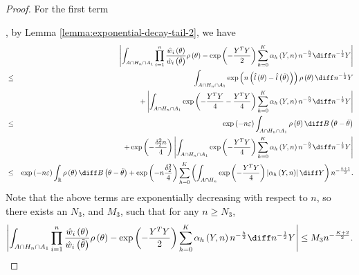 \begin{proof}
For the first term%
\begin{comment}
change the first second term ref into ref eq
\end{comment}
, by Lemma \ref{lemma:exponential-decay-tail-2}, we have
\begin{eqnarray*}
 &  & \left|\int_{A\cap H_{n}\cap A_{1}}\prod_{i=1}^{n}\frac{\hat{w}_{i}\left(\theta\right)}{\hat{w}_{i}\left(\tilde{\theta}\right)}\rho\left(\theta\right)-\exp\left(-\frac{Y^{T}Y}{2}\right)\sum_{h=0}^{K}\alpha_{h}\left(Y,n\right)n^{-\frac{h}{2}}\diff n^{-\frac{1}{2}}Y\right|\\
 & \le & \int_{A\cap H_{n}\cap A_{1}}\exp\left(n\left(\hat{l}\left(\theta\right)-\hat{l}\left(\tilde{\theta}\right)\right)\right)\rho\left(\theta\right)\diff n^{-\frac{1}{2}}Y\\
 &  & +\left|\int_{A\cap H_{n}\cap A_{1}}\exp\left(-\frac{Y^{T}Y}{4}-\frac{Y^{T}Y}{4}\right)\sum_{h=0}^{K}\alpha_{h}\left(Y,n\right)n^{-\frac{h}{2}}\diff n^{-\frac{1}{2}}Y\right|\\
 & \le & \exp\left(-n\varepsilon\right)\int_{A\cap H_{n}\cap A_{1}}\rho\left(\theta\right)\diff B\left(\theta-\tilde{\theta}\right)\\
 &  & +\exp\left(-\frac{\delta_{2}^{2}n}{4}\right)\left|\int_{A\cap H_{n}\cap A_{1}}\exp\left(-\frac{Y^{T}Y}{4}\right)\sum_{h=0}^{K}\alpha_{h}\left(Y,n\right)n^{-\frac{h}{2}}\diff n^{-\frac{1}{2}}Y\right|\\
 & \le & \exp\left(-n\varepsilon\right)\int_{\mathbb{R}}\rho\left(\theta\right)\diff B\left(\theta-\tilde{\theta}\right)+\exp\left(-n\frac{\delta_{2}^{2}}{4}\right)\sum_{h=0}^{K}\left(\int_{A\cap H_{n}}\exp\left(-\frac{Y^{T}Y}{4}\right)\left|\alpha_{h}\left(Y,n\right)\right|\diff Y\right)n^{-\frac{h+1}{2}}.
\end{eqnarray*}
Note that the above terms are exponentially decreasing with respect
to $n$, so there exists an $N_{3}$, and $M_{3}$, such that for
any $n\ge N_{3}$, 
\[
\left|\int_{A\cap H_{n}\cap A_{1}}\prod_{i=1}^{n}\frac{\hat{w}_{i}\left(\theta\right)}{\hat{w}_{i}\left(\tilde{\theta}\right)}\rho\left(\theta\right)-\exp\left(-\frac{Y^{T}Y}{2}\right)\sum_{h=0}^{K}\alpha_{h}\left(Y,n\right)n^{-\frac{h}{2}}\diff n^{-\frac{1}{2}}Y\right|\le M_{3}n^{-\frac{K+2}{2}}.
\]



\end{proof}
